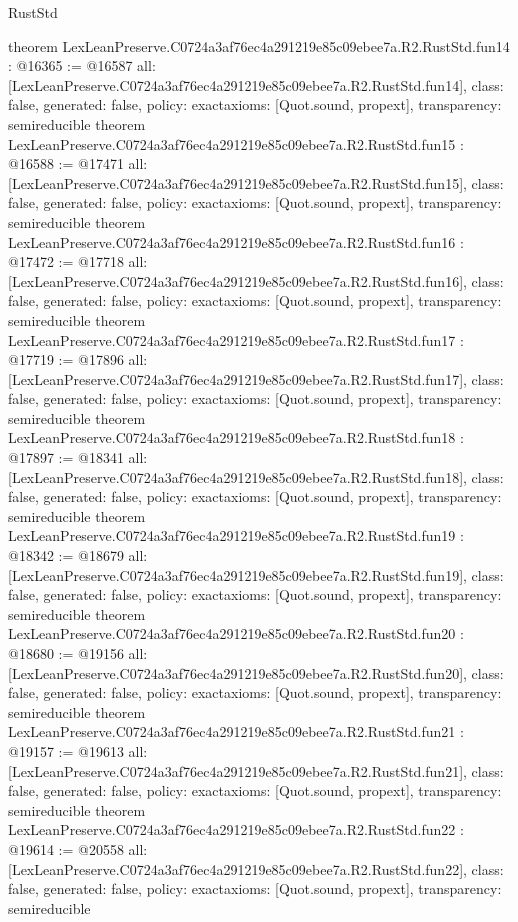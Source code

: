 \begin{lexlean}{RustStd}
\begin{coremodule}
{}
theorem LexLeanPreserve.C0724a3af76ec4a291219e85c09ebee7a.R2.RustStd.fun14 : @16365 := @16587 {
  all: [LexLeanPreserve.C0724a3af76ec4a291219e85c09ebee7a.R2.RustStd.fun14],
  class: false,
  generated: false,
  policy: exact{axioms: [Quot.sound, propext]},
  transparency: semireducible
}
theorem LexLeanPreserve.C0724a3af76ec4a291219e85c09ebee7a.R2.RustStd.fun15 : @16588 := @17471 {
  all: [LexLeanPreserve.C0724a3af76ec4a291219e85c09ebee7a.R2.RustStd.fun15],
  class: false,
  generated: false,
  policy: exact{axioms: [Quot.sound, propext]},
  transparency: semireducible
}
theorem LexLeanPreserve.C0724a3af76ec4a291219e85c09ebee7a.R2.RustStd.fun16 : @17472 := @17718 {
  all: [LexLeanPreserve.C0724a3af76ec4a291219e85c09ebee7a.R2.RustStd.fun16],
  class: false,
  generated: false,
  policy: exact{axioms: [Quot.sound, propext]},
  transparency: semireducible
}
theorem LexLeanPreserve.C0724a3af76ec4a291219e85c09ebee7a.R2.RustStd.fun17 : @17719 := @17896 {
  all: [LexLeanPreserve.C0724a3af76ec4a291219e85c09ebee7a.R2.RustStd.fun17],
  class: false,
  generated: false,
  policy: exact{axioms: [Quot.sound, propext]},
  transparency: semireducible
}
theorem LexLeanPreserve.C0724a3af76ec4a291219e85c09ebee7a.R2.RustStd.fun18 : @17897 := @18341 {
  all: [LexLeanPreserve.C0724a3af76ec4a291219e85c09ebee7a.R2.RustStd.fun18],
  class: false,
  generated: false,
  policy: exact{axioms: [Quot.sound, propext]},
  transparency: semireducible
}
theorem LexLeanPreserve.C0724a3af76ec4a291219e85c09ebee7a.R2.RustStd.fun19 : @18342 := @18679 {
  all: [LexLeanPreserve.C0724a3af76ec4a291219e85c09ebee7a.R2.RustStd.fun19],
  class: false,
  generated: false,
  policy: exact{axioms: [Quot.sound, propext]},
  transparency: semireducible
}
theorem LexLeanPreserve.C0724a3af76ec4a291219e85c09ebee7a.R2.RustStd.fun20 : @18680 := @19156 {
  all: [LexLeanPreserve.C0724a3af76ec4a291219e85c09ebee7a.R2.RustStd.fun20],
  class: false,
  generated: false,
  policy: exact{axioms: [Quot.sound, propext]},
  transparency: semireducible
}
theorem LexLeanPreserve.C0724a3af76ec4a291219e85c09ebee7a.R2.RustStd.fun21 : @19157 := @19613 {
  all: [LexLeanPreserve.C0724a3af76ec4a291219e85c09ebee7a.R2.RustStd.fun21],
  class: false,
  generated: false,
  policy: exact{axioms: [Quot.sound, propext]},
  transparency: semireducible
}
theorem LexLeanPreserve.C0724a3af76ec4a291219e85c09ebee7a.R2.RustStd.fun22 : @19614 := @20558 {
  all: [LexLeanPreserve.C0724a3af76ec4a291219e85c09ebee7a.R2.RustStd.fun22],
  class: false,
  generated: false,
  policy: exact{axioms: [Quot.sound, propext]},
  transparency: semireducible
}
\end{coremodule}
\end{lexlean}
